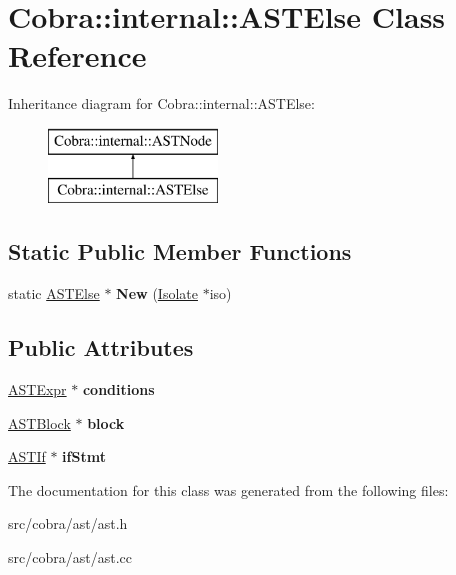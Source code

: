 \hypertarget{class_cobra_1_1internal_1_1_a_s_t_else}{\section{Cobra\+:\+:internal\+:\+:A\+S\+T\+Else Class Reference}
\label{class_cobra_1_1internal_1_1_a_s_t_else}
}
Inheritance diagram for Cobra\+:\+:internal\+:\+:A\+S\+T\+Else\+:\begin{figure}[H]
\begin{center}
\leavevmode
\includegraphics[height=2.000000cm]{class_cobra_1_1internal_1_1_a_s_t_else}
\end{center}
\end{figure}
\subsection*{Static Public Member Functions}
\begin{DoxyCompactItemize}
\item 
\hypertarget{class_cobra_1_1internal_1_1_a_s_t_else_ad40b80353d4b708ef4378e489cf7b6d7}{static \hyperlink{class_cobra_1_1internal_1_1_a_s_t_else}{A\+S\+T\+Else} $\ast$ {\bfseries New} (\hyperlink{class_cobra_1_1internal_1_1_isolate}{Isolate} $\ast$iso)}\label{class_cobra_1_1internal_1_1_a_s_t_else_ad40b80353d4b708ef4378e489cf7b6d7}

\end{DoxyCompactItemize}
\subsection*{Public Attributes}
\begin{DoxyCompactItemize}
\item 
\hypertarget{class_cobra_1_1internal_1_1_a_s_t_else_a6dbc7cd7172739f57de42510cfc261ca}{\hyperlink{class_cobra_1_1internal_1_1_a_s_t_expr}{A\+S\+T\+Expr} $\ast$ {\bfseries conditions}}\label{class_cobra_1_1internal_1_1_a_s_t_else_a6dbc7cd7172739f57de42510cfc261ca}

\item 
\hypertarget{class_cobra_1_1internal_1_1_a_s_t_else_a7353693c92ca38e5bef78ee483db681a}{\hyperlink{class_cobra_1_1internal_1_1_a_s_t_block}{A\+S\+T\+Block} $\ast$ {\bfseries block}}\label{class_cobra_1_1internal_1_1_a_s_t_else_a7353693c92ca38e5bef78ee483db681a}

\item 
\hypertarget{class_cobra_1_1internal_1_1_a_s_t_else_a61d07a78a5462b42d89428825cd7f168}{\hyperlink{class_cobra_1_1internal_1_1_a_s_t_if}{A\+S\+T\+If} $\ast$ {\bfseries if\+Stmt}}\label{class_cobra_1_1internal_1_1_a_s_t_else_a61d07a78a5462b42d89428825cd7f168}

\end{DoxyCompactItemize}


The documentation for this class was generated from the following files\+:\begin{DoxyCompactItemize}
\item 
src/cobra/ast/ast.\+h\item 
src/cobra/ast/ast.\+cc\end{DoxyCompactItemize}
